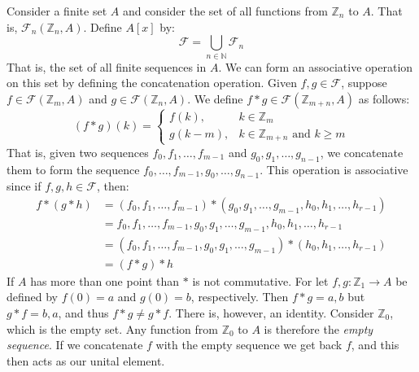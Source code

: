     \begin{example}
        Consider a finite set $A$ and consider the set of all functions from
        $\mathbb{Z}_{n}$ to $A$. That is, $\mathcal{F}_{n}(\mathbb{Z}_{n},A)$.
        Define $A[x]$ by:
        \begin{equation}
            \mathcal{F}=\bigcup_{n\in\mathbb{N}}\mathcal{F}_{n}
        \end{equation}
        That is, the set of all finite sequences in $A$. We can form an
        associative operation on this set by defining the concatenation
        operation. Given $f,g\in\mathcal{F}$, suppose
        $f\in\mathcal{F}(\mathbb{Z}_{m},A)$ and
        $g\in\mathcal{F}(\mathbb{Z}_{n},A)$. We define
        $f*g\in\mathcal{F}(\mathbb{Z}_{m+n},A)$ as follows:
        \begin{equation}
            (f*g)(k)=
            \begin{cases}
                f(k),&k\in\mathbb{Z}_{m}\\
                g(k-m),&k\in\mathbb{Z}_{m+n}\textrm{ and }k\geq{m}
            \end{cases}
        \end{equation}
        That is, given two sequences $f_{0},f_{1},\dots,f_{m-1}$ and
        $g_{0},g_{1},\dots,g_{n-1}$, we concatenate them to form the sequence
        $f_{0},\dots,f_{m-1},g_{0},\dots,g_{n-1}$. This operation is associative
        since if $f,g,h\in\mathcal{F}$, then:
        \begin{subequations}
            \begin{align}
                f*(g*h)&=(f_{0},f_{1},\dots,f_{m-1})
                    *(g_{0},g_{1},\dots,g_{m-1},h_{0},h_{1},\dots,h_{r-1})\\
                &=f_{0},f_{1},\dots,f_{m-1},
                    g_{0},g_{1},\dots,g_{m-1},h_{0},h_{1},\dots,h_{r-1}\\
                &=(f_{0},f_{1},\dots,f_{m-1},
                    g_{0},g_{1},\dots,g_{m-1})*(h_{0},h_{1},\dots,h_{r-1})\\
                &=(f*g)*h
            \end{align}
        \end{subequations}
        If $A$ has more than one point than $*$ is not commutative. For let
        $f,g:\mathbb{Z}_{1}\rightarrow{A}$ be defined by $f(0)=a$ and $g(0)=b$,
        respectively. Then $f*g=a,b$ but $g*f=b,a$, and thus $f*g\ne{g}*f$.
        There is, however, an identity. Consider $\mathbb{Z}_{0}$, which is the
        empty set. Any function from $\mathbb{Z}_{0}$ to $A$ is therefore the
        \textit{empty sequence}. If we concatenate $f$ with the empty sequence
        we get back $f$, and this then acts as our unital element.
    \end{example}
